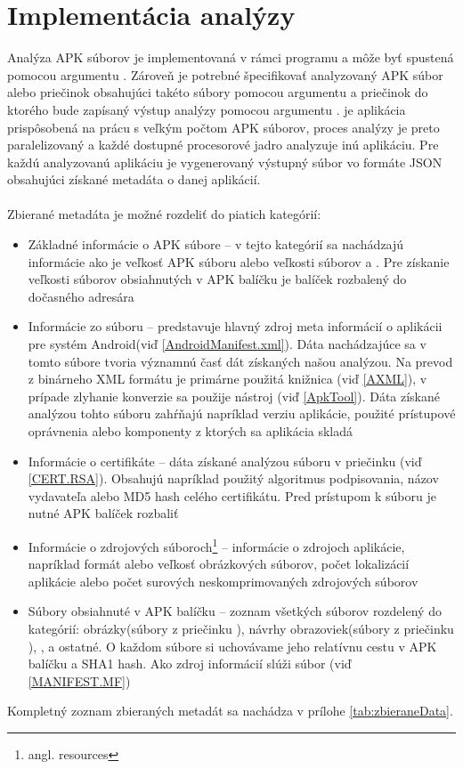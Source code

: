 \section{Implementácia analýzy}
Analýza APK súborov je implementovaná v rámci programu  a môže byť spustená pomocou argumentu . Zároveň je potrebné špecifikovať analyzovaný APK súbor alebo priečinok obsahujúci takéto súbory pomocou argumentu  a priečinok do ktorého bude zapísaný výstup analýzy pomocou argumentu .  je aplikácia prispôsobená na prácu s veľkým počtom APK súborov, proces analýzy je preto paralelizovaný a každé dostupné procesorové jadro analyzuje inú aplikáciu. Pre každú analyzovanú aplikáciu je vygenerovaný výstupný súbor vo formáte JSON obsahujúci získané metadáta o danej aplikácií. \\\\
Zbierané metadáta je možné rozdeliť do piatich kategórií:
\begin{itemize}
\item Základné informácie o APK súbore -- v tejto kategórií sa nachádzajú informácie ako je veľkosť APK súboru alebo veľkosti súborov  a . Pre získanie veľkosti súborov obsiahnutých v APK balíčku je balíček rozbalený do dočasného adresára
\item Informácie zo súboru  --  predstavuje hlavný zdroj meta informácií o aplikácii pre systém Android(viď \ref{AndroidManifest.xml}). Dáta nachádzajúce sa v tomto súbore tvoria významnú časť dát získaných našou analýzou. Na prevod z binárneho XML formátu je primárne použitá knižnica  (viď \ref{AXML}), v prípade zlyhanie konverzie sa použije  nástroj  (viď \ref{ApkTool}). Dáta získané analýzou tohto súboru zahŕňajú napríklad verziu aplikácie, použité prístupové oprávnenia alebo komponenty z ktorých sa aplikácia skladá
\item Informácie o certifikáte -- dáta získané analýzou súboru  v priečinku (viď \ref{CERT.RSA}). Obsahujú napríklad použitý algoritmus podpisovania, názov vydavateľa alebo MD5 hash celého certifikátu. Pred prístupom k súboru  je nutné APK balíček rozbaliť
\item Informácie o zdrojových súboroch\footnote{angl. resources} -- informácie o zdrojoch aplikácie, napríklad formát alebo veľkosť obrázkových súborov, počet lokalizácií aplikácie alebo počet surových neskomprimovaných zdrojových súborov
\item Súbory obsiahnuté v APK balíčku -- zoznam všetkých súborov rozdelený do kategórií: obrázky(súbory z priečinku ), návrhy obrazoviek(súbory z priečinku ), ,  a ostatné. O každom súbore si uchovávame jeho relatívnu cestu v APK balíčku a SHA1 hash. Ako zdroj informácií slúži súbor  (viď \ref{MANIFEST.MF})
\end{itemize}

\noindent Kompletný zoznam zbieraných metadát sa nachádza v prílohe \ref{tab:zbieraneData}.